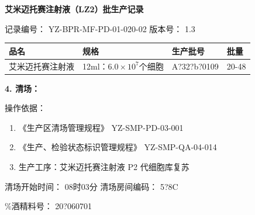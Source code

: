 \documentclass[UTF8,10pt,a4paper,fontset=fandol]{ctexart}
\newcommand{\fieldvalue}[1]{#1}
\newcommand{\handwritten}[1]{#1}
\begin{document}

\newpage

\begin{center}
\textbf{艾米迈托赛注射液（LZ2）批生产记录}
\end{center}

\noindent
记录编号：
\fieldvalue{YZ-BPR-MF-PD-01-020-02}
\hfill
版本号：
\fieldvalue{1.3}

\begin{tabularx}{\textwidth}{|>{\centering\arraybackslash}X|>{\centering\arraybackslash}X|>{\centering\arraybackslash}X|>{\centering\arraybackslash}X|}
\hline
品名 & 规格 & 生产批号 & 批量 \\
\hline
艾米迈托赛注射液 & 12ml：$6.0\times10^{7}$个细胞 &
\fieldvalue{\handwritten{A?32?b?0109}} &
\fieldvalue{\handwritten{20-48}} \\
\hline
\end{tabularx}

\medskip
\noindent\textbf{4. 清场：}

\medskip
\noindent 操作依据：

\begin{enumerate}
\item 《生产区清场管理规程》 \hfill YZ-SMP-PD-03-001
\item 《生产、检验状态标识管理规程》 \hfill YZ-SMP-QA-04-014
\item 生产工序：艾米迈托赛注射液 P2 代细胞库复苏
\end{enumerate}

\noindent
清场开始时间：
\fieldvalue{\handwritten{08时03分}}
\hfill
清场房间编码：
\fieldvalue{\handwritten{5?8C}}

\%酒精料号：
\fieldvalue{\handwritten{20?060701}}

\medskip
\end{document}

